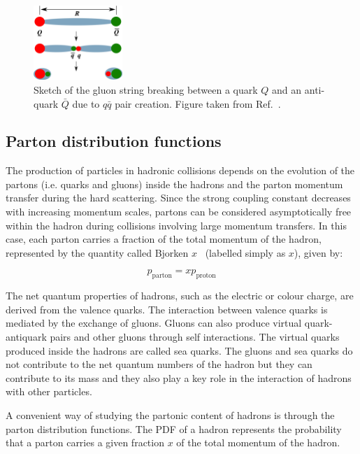 \begin{figure}[!htb]
 \centering
 \includegraphics[width=0.3\textwidth]{Figures/Introduction/StandardModel/QCDConfinement.png}
 \caption{Sketch of the gluon string breaking between a quark $Q$ and an anti-quark $\bar{Q}$ due to $q\bar{q}$ pair creation. Figure taken from Ref.~\cite{QCDConfinement_Figure}.}
 \label{fig:QCDConfinement}
\end{figure}

\subsection{Parton distribution functions}\label{sec:Physics_SI_PDF}

The production of particles in hadronic collisions depends on the evolution of the partons (i.e. quarks and gluons) inside the hadrons and the parton momentum transfer during the hard scattering. Since the strong coupling constant decreases with increasing momentum scales, partons can be considered asymptotically free within the hadron during collisions involving large momentum transfers. In this case, each parton carries a fraction of the total momentum of the hadron, represented by the quantity called Bjorken $x$~\cite{BjorkenX} (labelled simply as $x$), given by:

\begin{equation}
p_{\text{parton}} = xp_{\text{proton}}
\end{equation}

The net quantum properties of hadrons, such as the electric or colour charge, are derived from the valence quarks. The interaction between valence quarks is mediated by the exchange of gluons. Gluons can also produce virtual quark-antiquark pairs and other gluons through self interactions. The virtual quarks produced inside the hadrons are called sea quarks. The gluons and sea quarks do not contribute to the net quantum numbers of the hadron but they can contribute to its mass and they also play a key role in the interaction of hadrons with other particles.

A convenient way of studying the partonic content of hadrons is through the parton distribution functions. The PDF of a hadron represents the probability that a parton carries a given fraction $x$ of the total momentum of the hadron.


